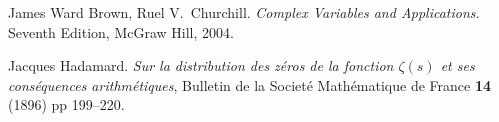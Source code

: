 \documentclass[11pt]{article}
\begin{document}
\begin{thebibliography}{99}

 James Ward Brown, Ruel V.~Churchill. \textit{Complex Variables and Applications.} Seventh Edition, McGraw Hill, 2004.   

 Jacques Hadamard. \textit{Sur la distribution des z\'{e}ros de la fonction $\zeta(s)$ et ses cons\'{e}quences arithm\'{e}tiques}, Bulletin de la Societ\'{e} Math\'{e}matique de France \textbf{14} (1896) pp 199--220.


\end{thebibliography}






\end{document}

